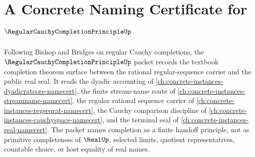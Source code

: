 \chapter{A Concrete Naming Certificate for $\RegularCauchyCompletionPrincipleUp$}
\label{ch:concrete-instances-regular-cauchy-completion-principle-namecert}

Following Bishop and Bridges on regular Cauchy completions, the $\RegularCauchyCompletionPrincipleUp$ packet records the textbook completion theorem surface between the rational regular-sequence carrier and the public real seal. It reads the dyadic accounting of \autoref{ch:concrete-instances-dyadicratcore-namecert}, the finite stream-name route of \autoref{ch:concrete-instances-streamname-namecert}, the regular rational sequence carrier of \autoref{ch:concrete-instances-regseqrat-namecert}, the Cauchy comparison discipline of \autoref{ch:concrete-instances-cauchyspace-namecert}, and the terminal seal of \autoref{ch:concrete-instances-real-namecert}. The packet names completion as a finite handoff principle, not as primitive completeness of $\RealUp$, selected limits, quotient representatives, countable choice, or host equality of real names.

